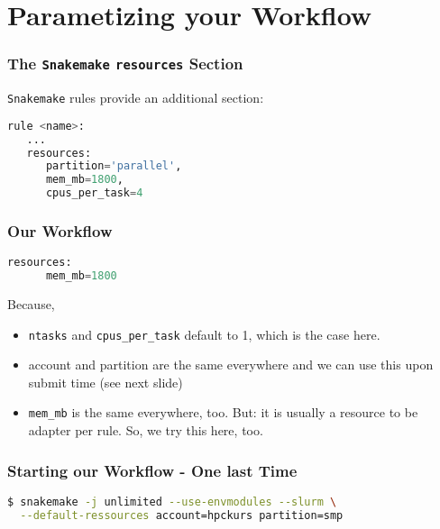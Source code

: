 \section{Parametizing your Workflow}

\begin{frame}[fragile]
  \frametitle{The \texttt{Snakemake} \texttt{resources} Section}
  \texttt{Snakemake} rules provide an additional section:
  \begin{lstlisting}[language=Python,style=Python]
rule <name>:
   ...
   resources:
      partition='parallel',
      mem_mb=1800,
      cpus_per_task=4
  \end{lstlisting}
\end{frame}

\begin{frame}[fragile]
  \frametitle{Our Workflow}
  \begin{lstlisting}[language=Python,style=Python]
   resources:
      mem_mb=1800
  \end{lstlisting}
  \pause
  Because,
  \begin{itemize}
   \item \texttt{ntasks} and \texttt{cpus\_per\_task} default to 1, which is the case here.
   \item account and partition are the same everywhere and we can use this upon submit time (see next slide)
   \item \texttt{mem\_mb} is the same everywhere, too. But: it is usually a resource to be adapter per rule. So, we try this here, too.
  \end{itemize}
\end{frame}

\begin{frame}[fragile]
  \frametitle{Starting our Workflow - One last Time}
  \begin{lstlisting}[language=Bash,style=Shell]
$ snakemake -j unlimited --use-envmodules --slurm \
  --default-ressources account=hpckurs partition=smp
  \end{lstlisting}
\end{frame}


